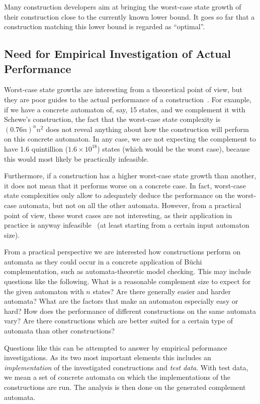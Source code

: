 Many construction developers aim at bringing the worst-case state growth of their construction close to the currently known lower bound. It goes so far that a construction matching this lower bound is regarded as ``optimal''. 


\subsection{Need for Empirical Investigation of Actual Performance}
\label{1_empirical}
Worst-case state growths are interesting from a theoretical point of view, but they are poor guides to the actual performance of a construction~\cite{2011_tsai}. For example, if we have a concrete automaton of, say, 15 states, and we complement it with Schewe's construction, the fact that the worst-case state complexity is $(0.76n)^n n^2$ does not reveal anything about how the construction will perform on this concrete automaton. In any case, we are not expecting the complement to have 1.6 quintillion ($1.6 \times 10^{18}$) states (which would be the worst case), because this would most likely be practically infeasible.

Furthermore, if a construction has a higher worst-case state growth than another, it does not mean that it performs worse on a concrete case. In fact, worst-case state complexities only allow to adequately deduce the performance on the worst-case automata, but not on all the other automata. However, from a practical point of view, these worst cases are not interesting, as their application in practice is anyway infeasible~\cite{1995_tasiran} (at least starting from a certain input automaton size).

From a practical perspective we are interested how constructions perform on automata as they could occur in a concrete application of Büchi complementation, such as automata-theoretic model checking. This may include questions like the following. What is a reasonable complement size to expect for the given automaton with $n$ states? Are there generally easier and harder automata? What are the factors that make an automaton especially easy or hard? How does the performance of different constructions on the same automata vary? Are there constructions which are better suited for a certain type of automata than other constructions?

Questions like this can be attempted to answer by empirical peformance investigations. As its two most important elements this includes an \textit{implementation} of the investigated constructions and \textit{test data}. With test data, we mean a set of concrete automata on which the implementations of the constructions are run. The analysis is then done on the generated complement automata.

